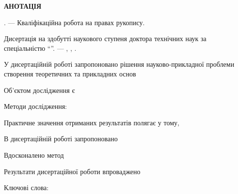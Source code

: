 \clearpage

{}

\begin{center}
\textbf{АНОТАЦІЯ}
\end{center}

\medskip

\textit{\dissauthorUa} \booknameUa.
--- Кваліфікаційна робота на правах рукопису.

Дисертація на здобутті наукового ступеня доктора технічних наук за спеціальністю
\dissSpecId ``\dissSpecUa''. --- \institutionUa, \belongUa, \bookyear.

У дисертаційній роботі запропоновано рішення науково-прикладної проблеми
створення теоретичних та прикладних основ

Об'єктом дослідження є 

Методи дослідження:

Практичне значення отриманих результатів полягає у тому,

В дисертаційній роботі запропоновано

Вдосконалено метод


Результати дисертаційної роботи впроваджено

Ключові слова:






